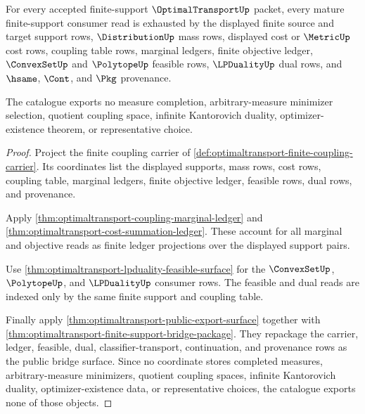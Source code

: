 \begin{theorem}
\label{thm:optimaltransport-mature-finite-support-catalogue}
For every accepted finite-support $\OptimalTransportUp$ packet, every mature
finite-support consumer read is exhausted by the displayed finite source and
target support rows, $\DistributionUp$ mass rows, displayed cost or
$\MetricUp$ cost rows, coupling table rows, marginal ledgers, finite objective
ledger, $\ConvexSetUp$ and $\PolytopeUp$ feasible rows, $\LPDualityUp$ dual
rows, and $\hsame$, $\Cont$, and $\Pkg$ provenance.

The catalogue exports no measure completion, arbitrary-measure minimizer
selection, quotient coupling space, infinite Kantorovich duality,
optimizer-existence theorem, or representative choice.
\end{theorem}
\begin{proof}
Project the finite coupling carrier of
\autoref{def:optimaltransport-finite-coupling-carrier}. Its coordinates list
the displayed supports, mass rows, cost rows, coupling table, marginal
ledgers, finite objective ledger, feasible rows, dual rows, and provenance.

Apply \autoref{thm:optimaltransport-coupling-marginal-ledger} and
\autoref{thm:optimaltransport-cost-summation-ledger}. These account for all
marginal and objective reads as finite ledger projections over the displayed
support pairs.

Use \autoref{thm:optimaltransport-lpduality-feasible-surface} for the
$\ConvexSetUp$, $\PolytopeUp$, and $\LPDualityUp$ consumer rows. The feasible
and dual reads are indexed only by the same finite support and coupling
table.

Finally apply \autoref{thm:optimaltransport-public-export-surface} together
with \autoref{thm:optimaltransport-finite-support-bridge-package}. They
repackage the carrier, ledger, feasible, dual, classifier-transport,
continuation, and provenance rows as the public bridge surface. Since no
coordinate stores completed measures, arbitrary-measure minimizers, quotient
coupling spaces, infinite Kantorovich duality, optimizer-existence data, or
representative choices, the catalogue exports none of those objects.
\end{proof}


